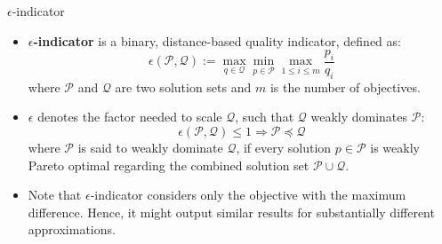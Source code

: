 \documentclass[11pt,compress,t,notes=noshow, xcolor=table]{beamer}
\begin{document}
\begin{vbframe}{$\epsilon$-indicator}

\begin{itemize}
\item \textbf{$\epsilon$-indicator} is a binary, distance-based quality indicator, defined as: 
$$
\epsilon (\mathcal{P}, \mathcal{Q}):= \max_{q \in \mathcal{Q}} \min_{p \in \mathcal{P}} \max_{1 \leq i \leq m} \frac{p_{i}}{q_{i}}
$$
\small
where $\mathcal{P}$ and $\mathcal{Q}$ are two solution sets and $m$ is the number of objectives. 
\vspace{0.2cm}
\normalsize
\item $\epsilon$ denotes the factor needed to scale $\mathcal{Q}$, such that $\mathcal{Q}$ weakly dominates $\mathcal{P}$:
$$
\epsilon(\mathcal{P}, \mathcal{Q}) \leq 1 \Rightarrow \mathcal{P} \preceq \mathcal{Q}
$$
\small
where $\mathcal{P}$ is said to weakly dominate $\mathcal{Q}$, if every solution $p \in \mathcal{P}$ is weakly Pareto optimal regarding the combined solution set $\mathcal{P} \cup \mathcal{Q}$.

\vspace{0.2cm}
\normalsize
\item Note that $\epsilon$-indicator considers only the objective with the maximum difference. Hence, it might output similar results for substantially different approximations.

\end{itemize}

\end{vbframe}
\end{document}
